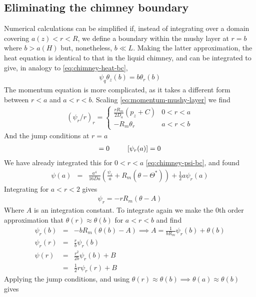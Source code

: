 \documentclass{article}
\begin{document}
\subsection{Eliminating the chimney boundary}
Numerical calculations can be simplified if, instead of integrating over a domain covering $a(z) < r < R$, we define a boundary within the mushy layer at $r=b$ where $b > a(H)$ but, nonetheless, $b \ll L$. Making the latter approximation, the heat equation is identical to that in the liquid chimney, and can be integrated to give, in analogy to \eqref{eq:chimney-heat-bc},
\begin{eqnarray}
\psi_q \theta_z(b) = b \theta_r(b)
\end{eqnarray}
The momentum equation is more complicated, as it takes a different form between $r<a$ and $a < r < b$. Scaling \eqref{eq:momentum-mushy-layer} we find
\begin{eqnarray}
(\psi_r / r)_r  = \left\{
  \begin{array}{lr}
   \frac{r R_m}{2 D_a} (p_z + C) & 0 < r < a\\
   - R_m \theta_r   & a < r <  b
  \end{array} \right.
\end{eqnarray}
And the jump conditions at $r=a$
\begin{eqnarray}
[\psi(a)] = 0 \hspace{6ex} [\psi_r(a)] = 0
\end{eqnarray}
We have already integrated this for $0 < r <a$ \eqref{eq:chimney-psi-bc}, and found 
\begin{eqnarray}
\psi(a) &=& \frac{a^4}{16 Da} \left(\frac{\psi_r}{a} + R_m (\theta - \Theta^*) \right)   + \frac{1}{2} a \psi_r(a)
\end{eqnarray}
Integrating for $a < r < 2$ gives
\begin{eqnarray}
\psi_r  = -r R_m (\theta - A)
\end{eqnarray}
Where $A$ is an integration constant. To integrate again we make the 0th order approximation that $\theta(r) \approx \theta(b)$ for $a < r < b$ and find
\begin{eqnarray}
\psi_r(b) &=& - b R_m(\theta(b) - A) \implies A = \frac{1}{b R_m} \psi_r(b) + \theta(b) \\
\psi_r(r) &=& \frac{r}{b} \psi_r(b) \\
\psi(r) &=& \frac{r^2}{2 b} \psi_r(b) + B \\
&=& \frac{1}{2} r \psi_r (r) + B
\end{eqnarray}
Applying the jump conditions, and using $\theta(r) \approx \theta(b) \implies \theta(a) \approx \theta(b)$ gives
\end{document}
